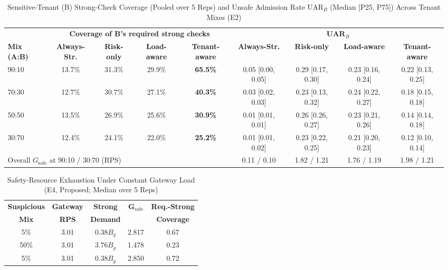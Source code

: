 \documentclass[conference]{IEEEtran}
\newcommand{\Gsafe}{G_{\mathrm{safe}}}
\newcommand{\Bg}{B_g}
\begin{document}
\begin{table}[t]
\caption{Sensitive-Tenant (B) Strong-Check Coverage (Pooled over 5 Reps) and Unsafe Admission Rate $\mathrm{UAR}_B$ (Median [P25, P75]) Across Tenant Mixes (E2)}
\label{tab:e2}
\centering
\footnotesize
\setlength{\tabcolsep}{4pt}
\begin{tabular}{lcccccccc}
\toprule
 & \multicolumn{4}{c}{\textbf{Coverage of B's required strong checks}} & \multicolumn{4}{c}{$\mathbf{UAR}_B$} \\
\cmidrule(lr){2-5}\cmidrule(lr){6-9}
\textbf{Mix (A:B)} & \textbf{Always-Str.} & \textbf{Risk-only} & \textbf{Load-aware} & \textbf{Tenant-aware} & \textbf{Always-Str.} & \textbf{Risk-only} & \textbf{Load-aware} & \textbf{Tenant-aware} \\
\midrule
90:10 & 13.7\% & 31.3\% & 29.9\% & \textbf{65.5\%} & 0.05 [0.00, 0.05] & 0.29 [0.17, 0.30] & 0.23 [0.16, 0.24] & 0.22 [0.13, 0.25] \\
70:30 & 12.7\% & 30.7\% & 27.1\% & \textbf{40.3\%} & 0.03 [0.02, 0.03] & 0.23 [0.13, 0.32] & 0.24 [0.22, 0.27] & 0.18 [0.15, 0.18] \\
50:50 & 13.5\% & 26.9\% & 25.6\% & \textbf{30.9\%} & 0.01 [0.01, 0.01] & 0.26 [0.26, 0.27] & 0.23 [0.21, 0.26] & 0.14 [0.14, 0.18] \\
30:70 & 12.4\% & 24.1\% & 22.0\% & \textbf{25.2\%} & 0.01 [0.01, 0.02] & 0.23 [0.22, 0.25] & 0.21 [0.20, 0.23] & 0.12 [0.10, 0.14] \\
\midrule
\multicolumn{5}{l}{Overall $\Gsafe$ at 90:10 / 30:70 (RPS)} & 0.11 / 0.10 & 1.82 / 1.21 & 1.76 / 1.19 & 1.98 / 1.21 \\
\bottomrule
\end{tabular}
\end{table}

\begin{table}[t]
\caption{Safety-Resource Exhaustion Under Constant Gateway Load (E4, Proposed; Median over 5 Reps)}
\label{tab:e4}
\centering
\begin{tabular}{ccccc}
\toprule
\textbf{Suspicious} & \textbf{Gateway} & \textbf{Strong} & $\boldsymbol{\Gsafe}$ & \textbf{Req.-Strong} \\
\textbf{Mix} & \textbf{RPS} & \textbf{Demand} & & \textbf{Coverage} \\
\midrule
5\%  & 3.01 & $0.38\Bg$ & 2.817 & 0.67 \\
50\% & 3.01 & $3.76\Bg$ & 1.478 & 0.23 \\
5\%  & 3.01 & $0.38\Bg$ & 2.850 & 0.72 \\
\bottomrule
\end{tabular}
\end{table}
\end{document}
